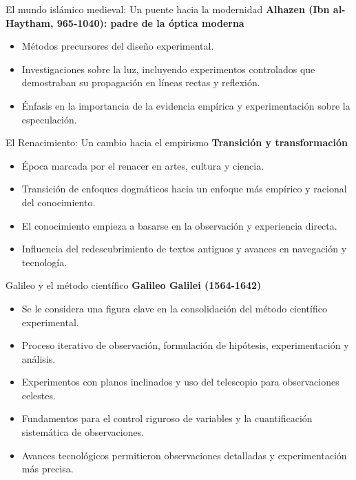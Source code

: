 ﻿\documentclass{beamer}
\begin{document}
\begin{frame}{El mundo islámico medieval: Un puente hacia la modernidad}
    \textbf{Alhazen (Ibn al-Haytham, 965-1040): padre de la óptica moderna}
    \begin{itemize}
        \item Métodos precursores del diseño experimental.
        \item Investigaciones sobre la luz, incluyendo experimentos controlados que demostraban su propagación en líneas rectas y reflexión.
        \item Énfasis en la importancia de la evidencia empírica y experimentación sobre la especulación.
    \end{itemize}
    \end{frame}

\begin{frame}{El Renacimiento: Un cambio hacia el empirismo}
    \textbf{Transición y transformación}
    \begin{itemize}
        \item Época marcada por el renacer en artes, cultura y ciencia.
        \item Transición de enfoques dogmáticos hacia un enfoque más empírico y racional del conocimiento.
        \item El conocimiento empieza a basarse en la observación y experiencia directa.
        \item Influencia del redescubrimiento de textos antiguos y avances en navegación y tecnología.
    \end{itemize}
\end{frame}

\begin{frame}{Galileo y el método científico}
    \textbf{Galileo Galilei (1564-1642)}
    \begin{itemize}
        \item Se le considera una figura clave en la consolidación del método científico experimental.
        \item Proceso iterativo de observación, formulación de hipótesis, experimentación y análisis.
        \item Experimentos con planos inclinados y uso del telescopio para observaciones celestes.
        \item Fundamentos para el control riguroso de variables y la cuantificación sistemática de observaciones.
        \item Avances tecnológicos permitieron observaciones detalladas y experimentación más precisa.
    \end{itemize}
\end{frame}
\end{document}
